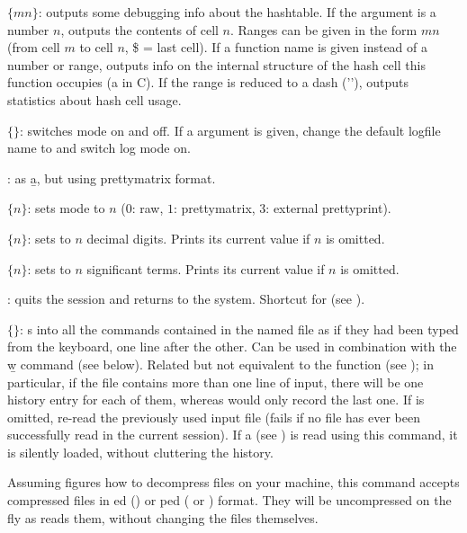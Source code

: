  $\{m$\kbd{-}$n\}$: outputs some debugging info about the
hashtable. If the argument is a number $n$, outputs the contents of cell
$n$. Ranges can be given in the form $m$\kbd{-}$n$ (from cell $m$ to cell
$n$, \$ = last cell). If a function name is given instead of a number or
range, outputs info on the internal structure of the hash cell this
function occupies (a  in C). If the range is reduced to
a dash ('\kbd{-}'), outputs statistics about hash cell usage.

 $\{$$\}$: switches  mode on and off.
If a  argument is given, change the default logfile name to
 and switch log mode on.

: as \b{a}, but using prettymatrix format.

 $\{n\}$: sets  mode to $n$ ($0$: raw, $1$:
prettymatrix, $3$: external prettyprint).

 $\{n\}$: sets  to $n$ decimal
digits. Prints its current value if $n$ is omitted.

 $\{n\}$: sets  to $n$ significant terms.
Prints its current value if $n$ is omitted.

: quits the  session and returns to the system.
Shortcut for \kbd{()} (see ).

 $\{$$\}$: s into  all the
commands contained in the named file as if they had been typed from the
keyboard, one line after the other. Can be used in combination with the \b{w}
command (see below). Related but not equivalent to the function 
(see ); in particular, if the file contains more than one
line of input, there will be one history entry for each of them, whereas
 would only record the last one. If  is omitted,
re-read the previously used input file (fails if no file has ever been
successfully read in the current session). If a  
(see ) is read using this command, it is silently loaded,
without cluttering the history.

Assuming  figures how to decompress files on your machine, this
command accepts compressed files in ed () or
ped ( or ) format. They will be uncompressed on
the fly as  reads them, without changing the files themselves.

